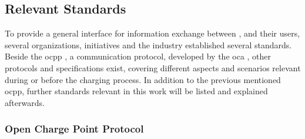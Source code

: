 \subsection{Relevant Standards}
\label{ch:Fundamentals:sec:Electric Mobility:ssec:Relevant Standards}

To provide a general interface for information exchange between ,  and their users, several organizations, initiatives and the industry established several standards.
Beside the \acrfull{ocpp} \cite{noauthor_ocpp_nodate-1}, a communication protocol, developed by the \acrfull{oca} \cite{noauthor_open_nodate}, other protocols and specifications exist, covering different aspects and scenarios relevant during or before the charging process.
In addition to the previous mentioned \acrshort{ocpp}, further standards relevant in this work will be listed and explained afterwards.

\subsubsection{Open Charge Point Protocol}
\label{ch:Fundamentals:sec:Electric Mobility:ssec:Relevant Standards:sssec:OCPP}

